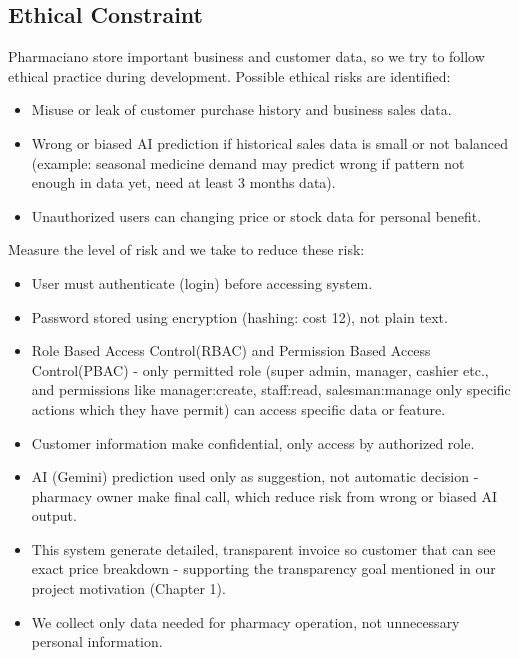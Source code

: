 \subsection{Ethical Constraint}
Pharmaciano store important business and customer data, so we try to follow ethical practice during development.
Possible ethical risks are identified:
\begin{itemize}
\item Misuse or leak of customer purchase history and business sales data.
\item Wrong or biased AI prediction if historical sales data is small or not balanced (example: seasonal medicine demand may predict wrong if pattern not enough in data yet, need at least 3 months data).
\item Unauthorized users can changing price or stock data for personal benefit.
\end{itemize}


Measure the level of risk and we take to reduce these risk:
\begin{itemize}
\item User must authenticate (login) before accessing system.
\item Password stored using encryption (hashing: cost 12), not plain text.
\item Role Based Access Control(RBAC) and Permission Based Access Control(PBAC) - only permitted role (super admin, manager, cashier etc., and permissions like manager:create, staff:read, salesman:manage only specific actions which they have permit) can access specific data or feature.
\item Customer information make confidential, only access by authorized role.
\item AI (Gemini) prediction used only as suggestion, not automatic decision - pharmacy owner make final call, which reduce risk from wrong or biased AI output.
\item This system generate detailed, transparent invoice so customer that can see exact price breakdown - supporting the transparency goal mentioned in our project motivation (Chapter 1).
\item We collect only data needed for pharmacy operation, not unnecessary personal information.
\end{itemize}

